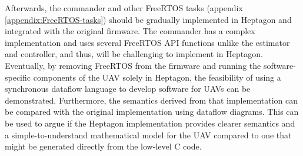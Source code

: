 \documentclass[10pt, a4paper]{article}
\begin{document}
    Afterwards, the commander and other FreeRTOS tasks (appendix \ref{appendix:FreeRTOS-tasks}) should be gradually implemented in Heptagon and integrated with the original firmware. The commander has a complex implementation and uses several FreeRTOS API functions unlike the estimator and controller, and thus, will be challenging to implement in Heptagon. Eventually, by removing FreeRTOS from the firmware and running the software-specific components of the UAV solely in Heptagon, the feasibility of using a synchronous dataflow language to develop software for UAVs can be demonstrated. Furthermore, the semantics derived from that implementation can be compared with the original implementation using dataflow diagrams. This can be used to argue if the Heptagon implementation provides clearer semantics and a simple-to-understand mathematical model for the UAV compared to one that might be generated directly from the low-level C code.

\newpage


\end{document}
